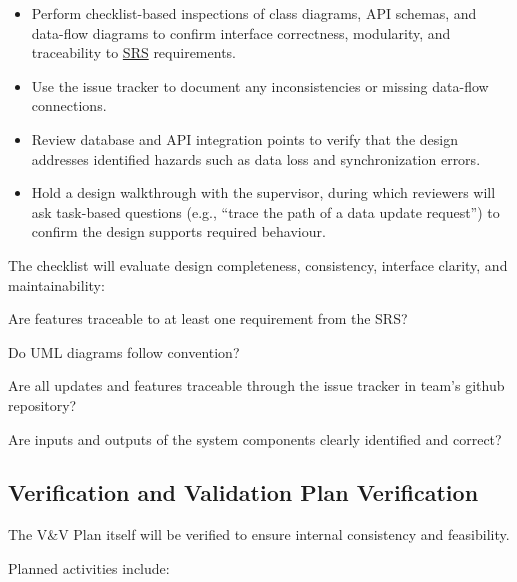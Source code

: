 \documentclass[12pt, titlepage]{article}
\begin{document}
\begin{itemize}
  \item Perform checklist-based inspections of class diagrams, API schemas, and
  data-flow diagrams to confirm interface correctness, modularity, and
  traceability to \href{https://github.com/thaafei/DomainX/blob/main/docs/SRS/SRS.pdf}{SRS} requirements.

  \item Use the issue tracker to document any inconsistencies or missing
  data-flow connections.

  \item Review database and API integration points to verify that the design
  addresses identified hazards such as data loss and synchronization errors.

  \item Hold a design walkthrough with the supervisor, during which reviewers
  will ask task-based questions (e.g., ``trace the path of a data update
  request'') to confirm the design supports required behaviour.
\end{itemize}

The checklist will evaluate design completeness, consistency, interface
clarity, and maintainability:
\begin{todolist}
  \item Are features traceable to at least one requirement from the SRS?
  \item Do UML diagrams follow convention?
  \item Are all updates and features traceable through the issue tracker in team's github repository?
  \item Are inputs and outputs of the system components clearly identified and correct?
\end{todolist}
\subsection{Verification and Validation Plan Verification}
\label{subsec:vnv-plan-verification}

The V\&V Plan itself will be verified to ensure internal consistency and
feasibility.

Planned activities include:
\end{document}
